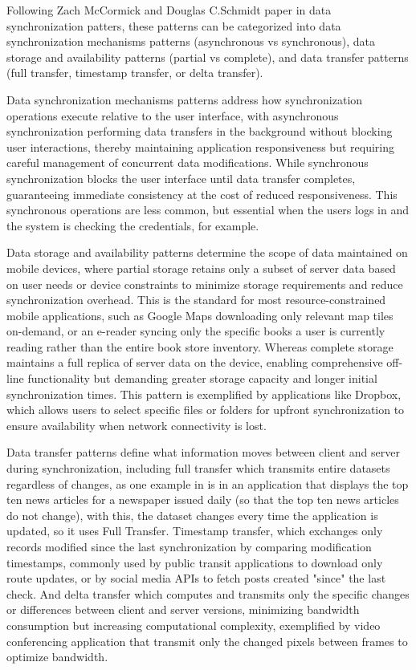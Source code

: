 Following Zach McCormick and Douglas C.Schmidt paper in data synchronization patters\cite{mccormick}, these patterns can be categorized into data synchronization mechanisms patterns (asynchronous vs synchronous), data storage and availability patterns (partial vs complete), and data transfer patterns (full transfer, timestamp transfer, or delta transfer).

Data synchronization mechanisms patterns address how synchronization operations execute relative to the user interface, with asynchronous synchronization performing data transfers in the background without blocking user interactions, thereby maintaining application responsiveness but requiring careful management of concurrent data modifications. While synchronous synchronization blocks the user interface until data transfer completes, guaranteeing immediate consistency at the cost of reduced responsiveness. This synchronous operations are less common, but essential when the users logs in and the system is checking the credentials, for example.

Data storage and availability patterns determine the scope of data maintained on mobile devices, where partial storage retains only a subset of server data based on user needs or device constraints to minimize storage requirements and reduce synchronization overhead. This is the standard for most resource-constrained mobile applications, such as Google Maps downloading only relevant map tiles on-demand, or an e-reader syncing only the specific books a user is currently reading rather than the entire book store inventory\cite{mccormick}. Whereas complete storage maintains a full replica of server data on the device, enabling comprehensive off-line functionality but demanding greater storage capacity and longer initial synchronization times. This pattern is exemplified by applications like Dropbox, which allows users to select specific files or folders for upfront synchronization to ensure availability when network connectivity is lost\cite{mccormick}.

Data transfer patterns define what information moves between client and server during synchronization, including full transfer which transmits entire datasets regardless of changes, as one example in \cite{mccormick} is in an application that displays the top ten news articles for a newspaper issued daily (so that the top ten news articles do not change), with this, the dataset changes every time the application is updated, so it uses Full Transfer. Timestamp transfer, which exchanges only records modified since the last synchronization by comparing modification timestamps, commonly used by public transit applications to download only route updates, or by social media APIs to fetch posts created "since" the last check. And delta transfer which computes and transmits only the specific changes or differences between client and server versions, minimizing bandwidth consumption but increasing computational complexity, exemplified by video conferencing application that transmit only the changed pixels between frames to optimize bandwidth.\cite{mccormick}

